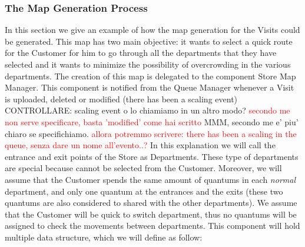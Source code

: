 \documentclass[a4paper, 12pt, oneside, table]{article}
\newcommand*{\lorenzo}[1]{\textcolor{BurntOrange}{#1}}
\newcommand{\yasmin}[1]{\textcolor{Red}{#1}}
\begin{document}
\subsubsection{The Map Generation Process}
In this section we give an example of how the map generation for the Visits could be generated.\newline
This map has two main objective: it wants to select a quick route for the Customer for him to go through all the departments that they have selected and it wants to minimize the possibility of overcrowding in the various departments. \newline
The creation of this map is delegated to the component Store Map Manager. \newline
This component is notified from the Queue Manager whenever a Visit is uploaded, deleted or modified (there has been a scaling event) \lorenzo{CONTROLLARE: scaling event o lo chiamiamo in un altro modo?} \yasmin{secondo me non serve specificare, basta 'modified' come hai scritto} \lorenzo{MMM, secondo me e' piu' chiaro se specifichiamo}. \yasmin{allora potremmo scrivere: there has been a scaling in the queue, senza dare un nome all'evento..?}\newline
In this explanation we will call the entrance and exit points of the Store as Departments. These type of departments are special because cannot be selected from the Customer.\newline 
Moreover, we will assume that the Customer spends the same amount of quantums in each \textit{normal} department, and only one quantum at the entrances and the exits (these two quantums are also considered to shared with the other departments). We assume that the Customer will be quick to switch department, thus no quantums will be assigned to check the movements between departments. \newline
This component will hold multiple data structure, which we will define as follow:
\end{document}
